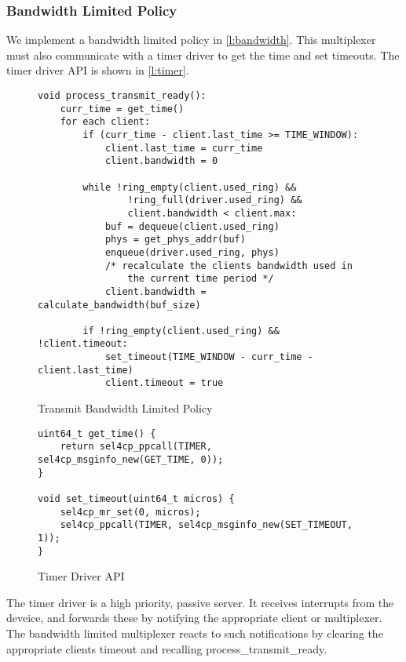 \subsubsection{Bandwidth Limited Policy}

We implement a bandwidth limited policy in \autoref{l:bandwidth}. This multiplexer must
also communicate with a timer driver to get the time and set timeouts. The timer driver
API is shown in \autoref{l:timer}.

\begin{figure} [H]
    \begin{verbatim}
void process_transmit_ready():
    curr_time = get_time()
    for each client:
        if (curr_time - client.last_time >= TIME_WINDOW):
            client.last_time = curr_time
            client.bandwidth = 0
        
        while !ring_empty(client.used_ring) && 
                !ring_full(driver.used_ring) && 
                client.bandwidth < client.max:
            buf = dequeue(client.used_ring)
            phys = get_phys_addr(buf)
            enqueue(driver.used_ring, phys)
            /* recalculate the clients bandwidth used in 
                the current time period */ 
            client.bandwidth = calculate_bandwidth(buf_size)

        if !ring_empty(client.used_ring) && !client.timeout:
            set_timeout(TIME_WINDOW - curr_time - client.last_time)
            client.timeout = true
\end{verbatim}
\caption{Transmit Bandwidth Limited Policy}
\label{l:bandwidth}
\end{figure}

\begin{figure} [H]
    \begin{verbatim}
uint64_t get_time() {
    return sel4cp_ppcall(TIMER, sel4cp_msginfo_new(GET_TIME, 0));
}
        
void set_timeout(uint64_t micros) {
    sel4cp_mr_set(0, micros);
    sel4cp_ppcall(TIMER, sel4cp_msginfo_new(SET_TIMEOUT, 1));
}
\end{verbatim}
\caption{Timer Driver API}
\label{l:timer}
\end{figure}

The timer driver is a high priority, passive server. It receives interrupts from the deveice,
and forwards these by notifying the appropriate client or multiplexer. The bandwidth limited
multiplexer reacts to such notifications by clearing the appropriate clients timeout and
recalling process\_transmit\_ready.

